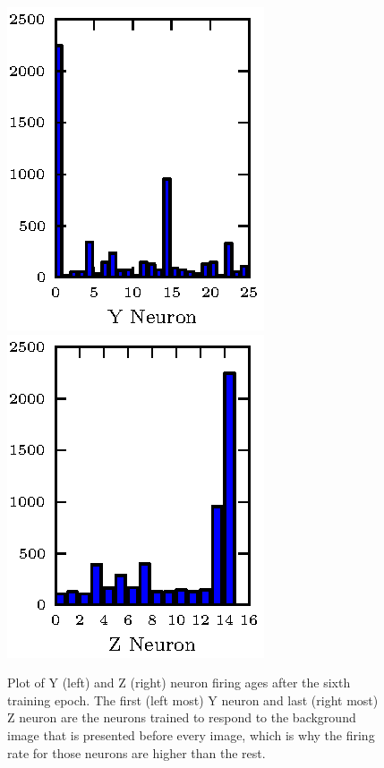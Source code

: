 \documentclass[conference]{IEEEtran}
\begin{document}
\begin{figure}
\center
\fontsize{8}{12}\selectfont
\includegraphics{5_yneuron/epoch_5_y_ages.eps}
\includegraphics{5_yneuron/epoch_5_z_ages.eps}
\caption{Plot of Y (left) and Z (right) neuron firing ages after the sixth training epoch.  The first (left most) Y neuron and last (right most) Z neuron are the neurons trained to respond to the background image that is presented before every image, which is why the firing rate for those neurons are higher than the rest.}
\label{fig:ages}
\end{figure}
\end{document}
